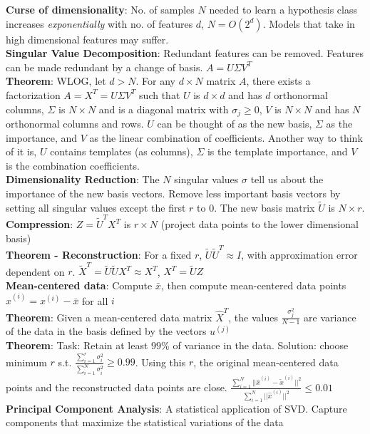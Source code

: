 \documentclass{article}
\begin{document}
{\begin{multicols*}{3}
\textbf{Curse of dimensionality}: No. of samples $N$ needed to learn a hypothesis class increases \textit{exponentially} with no. of features $d$, $N=O(2^d)$. Models that take in high dimensional features may suffer. \\
\textbf{Singular Value Decomposition}: Redundant features can be removed. Features can be made redundant by a change of basis. $A=U\Sigma V^T$ \\
\textbf{Theorem}: WLOG, let $d>N$. For any $d\times N$ matrix $A$, there exists a factorization $A=X^T=U\Sigma V^T$ such that $U$ is $d\times d$ and has $d$ orthonormal columns, $\Sigma$ is $N\times N$ and is a diagonal matrix with $\sigma_j\geq 0$, $V$ is $N\times N$ and has $N$ orthonormal columns and rows. $U$ can be thought of as the new basis, $\Sigma$ as the importance, and $V$ as the linear combination of coefficients. Another way to think of it is, $U$ contains templates (as columns), $\Sigma$ is the template importance, and $V$ is the combination coefficients.\\
\textbf{Dimensionality Reduction}: The $N$ singular values $\sigma$ tell us about the importance of the new basis vectors. Remove less important basis vectors by setting all singular values except the first $r$ to 0. The new basis matrix $\tilde{U}$ is $N\times r$. \\
\textbf{Compression}: $Z=\tilde{U}^TX^T$ is $r\times N$ (project data points to the lower dimensional basis)\\
\textbf{Theorem - Reconstruction}: For a fixed $r$, $\tilde{U}\tilde{U}^T\approx I$, with approximation error dependent on $r$. $\tilde{X}^T=\tilde{U}\tilde{U}X^T\approx X^T$, $X^T=\tilde{U}Z$\\
\textbf{Mean-centered data}: Compute $\bar{x}$, then compute mean-centered data points $\hat{x}^{(i)}=x^{(i)}-\bar{x}$ for all $i$ \\
\textbf{Theorem}: Given a mean-centered data matrix $\hat{X}^T$, the values $\frac{\sigma_j^2}{N-1}$ are variance of the data in the basis defined by the vectors $u^{(j)}$\\
\textbf{Theorem}: Task: Retain at least 99\% of variance in the data. Solution: choose minimum $r$ s.t. $\frac{\sum_{i=1}^r\sigma_i^2}{\sum_{i=1}^N\sigma_i^2}\geq0.99$. Using this $r$, the original mean-centered data points and the reconstructed data points are close. $\frac{\sum_{i=1}^N||\hat{x}^{(i)}-\tilde{x}^{(i)}||^2}{\sum_{i=1}^N||\hat{x}^{(i)}||^2}\leq0.01$\\
\textbf{Principal Component Analysis}: A statistical application of SVD. Capture components that maximize the statistical variations of the data

\end{multicols*}}
\end{document}
